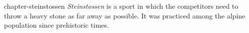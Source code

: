 

\chapter{}{chapter-steinstossen}{%
  \emph{Steinstossen} is a sport in which the competitors need to throw a heavy
  stone as far away as possible. It was practiced among the alpine population since prehistoric times.
}{
}

\label{ch:feasibility}





